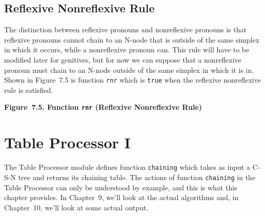 \documentclass{article}
\begin{document}

\subsection{Reflexive Nonreflexive Rule}

The distinction between reflexive pronouns and nonreflexive
pronouns is that reflexive pronouns cannot chain to an N-node
that is outside of the same simplex in which it occurs, while a
nonreflexive pronoun can. This rule will have to be modified
later for genitives, but for now we can suppose that a
nonreflexive pronoun must chain to an N-node outside of the same
simplex in which it is in. Shown in Figure~7.5 is function
\texttt{rnr} which is \texttt{true} when the reflexive
nonreflexive rule is satisfied.

\bigbreak
\begin{minipage}{\textwidth}
\vbox{}
\bigbreak
{}
\textbf{Figure~7.5. Function \texttt{rnr} (Reflexive Nonreflexive Rule)}
\end{minipage}
\bigbreak

%
%

\section{Table Processor I}

The Table Processor module defines function \texttt{chaining}
which takes as input a C-S-N tree and returns its chaining
table. The actions of function \texttt{chaining} in the Table
Processor can only be understood by example, and this is what
this chapter provides. In Chapter~9, we'll look at the actual
algorithms and, in Chapter~10, we'll look at some actual output.
\end{document}

